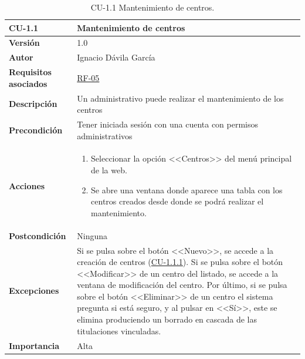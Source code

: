 \begin{table}[p]
\label{table:CU-1.1}
	\centering
	\begin{tabularx}{\linewidth}{ p{} p{} }
		\toprule
		\textbf{CU-1.1}    & \textbf{Mantenimiento de centros}\\
		\toprule
		\textbf{Versión}              & 1.0    \\
		\textbf{Autor}                & Ignacio Dávila García \\
		\textbf{Requisitos asociados} & \hyperref[itm:RF5]{RF-05} \\
		\textbf{Descripción}          & Un administrativo puede realizar el mantenimiento de los centros \\
		\textbf{Precondición}         & Tener iniciada sesión con una cuenta con permisos administrativos \\
		\textbf{Acciones}             &
		\begin{enumerate}
			\def\labelenumi{\arabic{enumi}.}
			\tightlist
			\item Seleccionar la opción <<Centros>> del menú principal de la web.
			\item Se abre una ventana donde aparece una tabla con los centros creados desde donde se podrá realizar el mantenimiento.
		\end{enumerate}\\
		\textbf{Postcondición}        & Ninguna \\
		\textbf{Excepciones}          & Si se pulsa sobre el botón <<Nuevo>>, se accede a la creación de centros (\hyperref[table:CU-1.1.1]{CU-1.1.1}). Si se pulsa sobre el botón <<Modificar>> de un centro del listado, se accede a la ventana de modificación del centro. Por último, si se pulsa sobre el botón <<Eliminar>> de un centro el sistema pregunta si está seguro, y al pulsar en <<Sí>>, este se elimina produciendo un borrado en cascada de las titulaciones vinculadas. \\
		\textbf{Importancia}          & Alta \\
		\bottomrule
	\end{tabularx}
	\caption{CU-1.1 Mantenimiento de centros.}
\end{table}
\FloatBarrier

